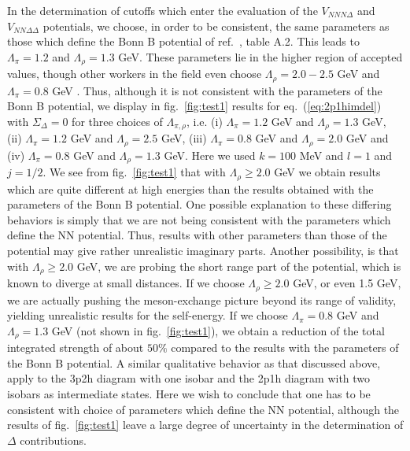 In the determination of cutoffs which enter the evaluation of the
$V_{NNN\Delta}$ and $V_{NN\Delta\Delta}$ potentials, we choose, in order
to be consistent, the same
parameters as those which define the Bonn B potential of ref.\ \cite{mac89},
table A.2. This leads to $\Lambda_{\pi}=1.2$ and $\Lambda_{\rho}=1.3$ GeV.
These parameters lie in the higher region of accepted values, though other
workers in the field even choose $\Lambda_{\rho}=2.0-2.5$ GeV
\cite{garc91,ost92} and $\Lambda_{\pi}=0.8$ GeV
\cite{ost92}. Thus, although it is not consistent with the 
parameters of the Bonn B potential, we display in fig.\ \ref{fig:test1}
results for eq.\ (\ref{eq:2p1himdel}) with $\Sigma_{\Delta}=0$ for three
choices of $\Lambda_{\pi ,\rho}$, i.e. (i) $\Lambda_{\pi}=1.2$ GeV
and $\Lambda_{\rho}=1.3$ GeV, (ii) $\Lambda_{\pi}=1.2$ GeV and
$\Lambda_{\rho}=2.5$ GeV, (iii) $\Lambda_{\pi}=0.8$ GeV and 
$\Lambda_{\rho}=2.0$ GeV and (iv)
$\Lambda_{\pi}=0.8$ GeV and 
$\Lambda_{\rho}=1.3$ GeV.
Here we used $k=100$ MeV and $l=1$ and 
$j=1/2$. We see from fig.\ \ref{fig:test1} 
that  
with $\Lambda_{\rho}\geq 2.0$ GeV we obtain results which are quite different
at high energies than the results obtained with the parameters of the
Bonn B potential. One possible explanation to these differing behaviors
is simply that we are not being consistent with the parameters which define
the NN potential. Thus, results with other parameters than those of
the potential  may give rather unrealistic imaginary parts. Another
possibility, is that
with $\Lambda_{\rho}\geq 2.0$ GeV, we
are probing the short range part of the potential, which is known
to diverge at small distances. If we choose $\Lambda_{\rho}\geq 2.0$ GeV,
or even 1.5 GeV, we are actually pushing the meson-exchange picture
beyond its range of validity, yielding unrealistic results for the
self-energy. If we choose $\Lambda_{\pi}=0.8$ GeV and $\Lambda_{\rho}=1.3$ GeV
(not shown in fig.\ \ref{fig:test1}), we obtain a reduction 
of the total integrated strength of about $50\%$ 
compared to the results with the parameters of the Bonn B potential.
A similar qualitative behavior as that discussed above, apply to the 
3p2h diagram with one isobar and the 2p1h diagram with two isobars
as intermediate states. 
Here we wish to conclude that one has to be consistent with choice of
parameters which define the NN potential, although the results of fig.\
\ref{fig:test1} leave a large degree of uncertainty in the determination
of $\Delta$ contributions.



